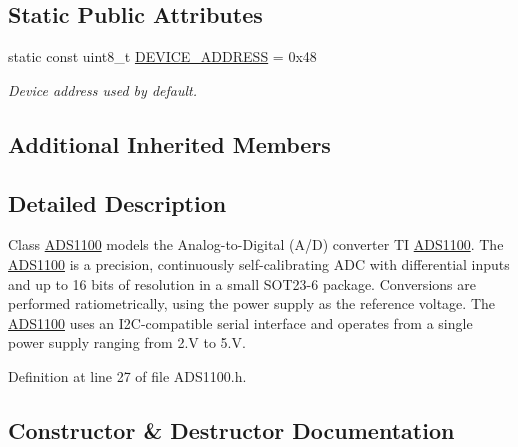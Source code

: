 \subsection*{Static Public Attributes}
\begin{DoxyCompactItemize}
\item 
\hypertarget{classsmrtobj_1_1i2c_1_1_a_d_s1100_afa5602c2717ec53e4401a1d31bb1d0dd}{}static const uint8\+\_\+t \hyperlink{classsmrtobj_1_1i2c_1_1_a_d_s1100_afa5602c2717ec53e4401a1d31bb1d0dd}{D\+E\+V\+I\+C\+E\+\_\+\+A\+D\+D\+R\+E\+S\+S} = 0x48\label{classsmrtobj_1_1i2c_1_1_a_d_s1100_afa5602c2717ec53e4401a1d31bb1d0dd}

\begin{DoxyCompactList}\small\item\em Device address used by default. \end{DoxyCompactList}\end{DoxyCompactItemize}
\subsection*{Additional Inherited Members}


\subsection{Detailed Description}
Class \hyperlink{classsmrtobj_1_1i2c_1_1_a_d_s1100}{A\+D\+S1100} models the Analog-\/to-\/\+Digital (A/\+D) converter T\+I \hyperlink{classsmrtobj_1_1i2c_1_1_a_d_s1100}{A\+D\+S1100}. The \hyperlink{classsmrtobj_1_1i2c_1_1_a_d_s1100}{A\+D\+S1100} is a precision, continuously self-\/calibrating A\+D\+C with differential inputs and up to 16 bits of resolution in a small S\+O\+T23-\/6 package. Conversions are performed ratiometrically, using the power supply as the reference voltage. The \hyperlink{classsmrtobj_1_1i2c_1_1_a_d_s1100}{A\+D\+S1100} uses an I2\+C-\/compatible serial interface and operates from a single power supply ranging from 2.\+V to 5.\+V. 

Definition at line 27 of file A\+D\+S1100.\+h.



\subsection{Constructor \& Destructor Documentation}
\hypertarget{classsmrtobj_1_1i2c_1_1_a_d_s1100_a52f87f6cbfdc26c07a2c9bfa9e703928}{}
